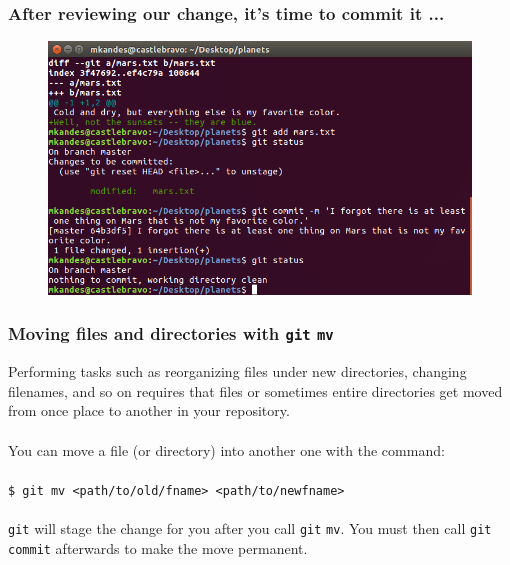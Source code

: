 \documentclass{beamer}
\begin{document}
\begin{frame}
   \frametitle{After reviewing our change, it's time to commit it ...}
   \begin{figure}[htbp]
      \includegraphics[width=1.0\textwidth]{images/git-add-and-commit-modified-file.png}
   \end{figure}
\end{frame}

\begin{frame}
   \frametitle{Moving files and directories with \texttt{git} \texttt{mv}}
   Performing tasks such as reorganizing files under new directories, 
   changing filenames, and so on requires that files or sometimes entire 
   directories get moved from once place to another in your repository. 
   \\ \ \\
   You can move a file (or directory) into another one with the command:
   \\ \ \\
   \texttt{\hspace{1.0em}\$ git mv <path/to/old/fname> <path/to/newfname>}
   \\ \ \\
   \texttt{git} will stage the change for you after you call 
   \texttt{git} \texttt{mv}. You must then call \texttt{git} 
   \texttt{commit} afterwards to make the move permanent.
\end{frame}
\end{document}
